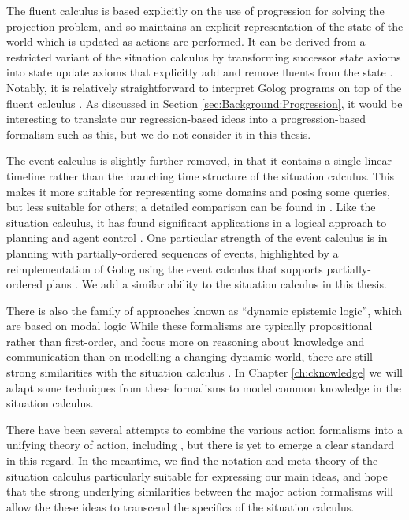 The fluent calculus is based explicitly on the use of progression
for solving the projection problem, and so maintains an explicit representation
of the state of the world which is updated as actions are performed.
It can be derived from a restricted variant of the situation calculus
by transforming successor state axioms into state update axioms that
explicitly add and remove fluents from the state \citep{thielscher99fluentcalc_from_sitcalc}.
Notably, it is relatively straightforward to interpret Golog programs
on top of the fluent calculus \citep{thielscher05golog_in_flux}.
As discussed in Section \ref{sec:Background:Progression}, it would
be interesting to translate our regression-based ideas into a progression-based
formalism such as this, but we do not consider it in this thesis.

The event calculus is slightly further removed, in that it contains
a single linear timeline rather than the branching time structure
of the situation calculus. This makes it more suitable for representing
some domains and posing some queries, but less suitable for others;
a detailed comparison can be found in \citep{kowalski97reconcile_sitcalc_evtcalc,belleghem97sitcalc_evtcalc}.
Like the situation calculus, it has found significant applications
in a logical approach to planning and agent control \citep{shanahan00ec_planner}.
One particular strength of the event calculus is in planning with
partially-ordered sequences of events, highlighted by a reimplementation
of Golog using the event calculus that supports partially-ordered
plans \citep{pereira04ec_golog}. We add a similar ability to the
situation calculus in this thesis.

There is also the family of approaches known as {}``dynamic epistemic
logic'', which are based on modal logic \citep{baltag98pa_ck,vanBenthem06lcc,vanBentham06tree_of_knowledge}
While these formalisms are typically propositional rather than first-order,
and focus more on reasoning about knowledge and communication than
on modelling a changing dynamic world, there are still strong similarities
with the situation calculus \citep{vanbentham07ml_sitcalc}. In Chapter
\ref{ch:cknowledge} we will adapt some techniques from these formalisms
to model common knowledge in the situation calculus.

There have been several attempts to combine the various action formalisms
into a unifying theory of action, including \citep{belleghem95combine_sitcalc_evtcalc,kowalski97reconcile_sitcalc_evtcalc,thielscher06reconcile_sc_fc,thielscher07unifying_action_calculus},
but there is yet to emerge a clear standard in this regard. In the
meantime, we find the notation and meta-theory of the situation calculus
particularly suitable for expressing our main ideas, and hope that
the strong underlying similarities between the major action formalisms
will allow the these ideas to transcend the specifics of the situation
calculus.


